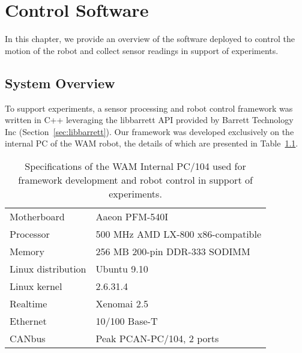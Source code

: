 \chapter{Control Software}
\label{chap4}

In this chapter, we provide an overview of the software deployed to control the motion of the robot and collect sensor readings in support of experiments.


\section{System Overview}
To support experiments, a sensor processing and robot control framework was written in C++ leveraging the libbarrett API provided by Barrett Technology Inc (Section~\ref{sec:libbarrett}). 
Our framework was developed exclusively on the internal PC of the WAM robot, the details of which are presented in Table~\ref{tbl:wam_specs}.

\begin{table}[h]
\centering
\begin{tabular}{|l|l|}
\hline
Motherboard        & Aaeon PFM-540I                    \\
Processor          & 500 MHz AMD LX-800 x86-compatible \\
Memory             & 256 MB 200-pin DDR-333 SODIMM     \\
Linux distribution & Ubuntu 9.10                       \\
Linux kernel       & 2.6.31.4                          \\
Realtime           & Xenomai 2.5                       \\
Ethernet           & 10/100 Base-T                     \\
CANbus             & Peak PCAN-PC/104, 2 ports         \\ \hline
\end{tabular}
\caption{Specifications of the WAM Internal PC/104 \cite{wam_specs} used for framework development and robot control in support of experiments.}
\label{tbl:wam_specs}
\end{table}

